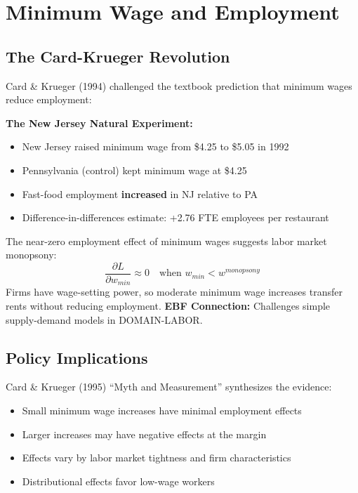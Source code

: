 \section{Minimum Wage and Employment}

\subsection{The Card-Krueger Revolution}

Card \& Krueger (1994) challenged the textbook prediction that minimum wages reduce employment:

\begin{tcolorbox}[colback=blue!5!white, colframe=blue!75!black]
\textbf{The New Jersey Natural Experiment:}
\begin{itemize}
    \item New Jersey raised minimum wage from \$4.25 to \$5.05 in 1992
    \item Pennsylvania (control) kept minimum wage at \$4.25
    \item Fast-food employment \textbf{increased} in NJ relative to PA
    \item Difference-in-differences estimate: +2.76 FTE employees per restaurant
\end{itemize}
\end{tcolorbox}

\begin{axiom}
\label{ax:dc2}
The near-zero employment effect of minimum wages suggests labor market monopsony:
\begin{equation}
\frac{\partial L}{\partial w_{min}} \approx 0 \quad \text{when } w_{min} < w^{monopsony}
\end{equation}
Firms have wage-setting power, so moderate minimum wage increases transfer rents without reducing employment.
\textbf{EBF Connection:} Challenges simple supply-demand models in DOMAIN-LABOR.
\end{axiom}

\subsection{Policy Implications}

Card \& Krueger (1995) ``Myth and Measurement'' synthesizes the evidence:
\begin{itemize}
    \item Small minimum wage increases have minimal employment effects
    \item Larger increases may have negative effects at the margin
    \item Effects vary by labor market tightness and firm characteristics
    \item Distributional effects favor low-wage workers
\end{itemize}


